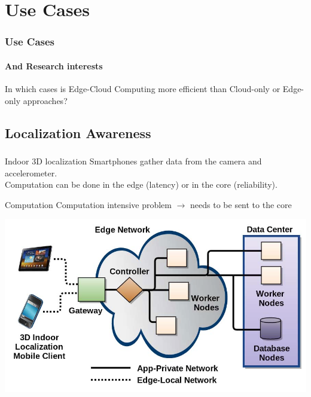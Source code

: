 \documentclass[utf8,xcolor=table, page number]{earlywinter}
\begin{document}
\section{Use Cases}

\begin{frame}
  \frametitle{Use Cases}
  \framesubtitle{And Research interests}

  \begin{block}{}
    In which cases is Edge-Cloud Computing more efficient than Cloud-only or Edge-only approaches?
  \end{block}

\end{frame}

\subsection{Localization Awareness}
\begin{frame}
  \frametitle{\secname}
  \framesubtitle{\subsecname}

  \begin{exampleblock}{Indoor 3D localization}
    Smartphones gather data from the camera and accelerometer.\\%
    Computation can be done in the edge (latency) or in the core (reliability).
  \end{exampleblock}

  \begin{minipage}[l]{0.3\linewidth}
    \begin{exampleblock}{Computation}
      Computation intensive problem $\to$ needs to be sent to the core
    \end{exampleblock}
  \end{minipage}
  \begin{minipage}[l]{0.65\linewidth}
  \begin{center}
  \includegraphics[scale=0.2]{indoor}
  \end{center}
  \end{minipage}

\end{frame}
\end{document}
